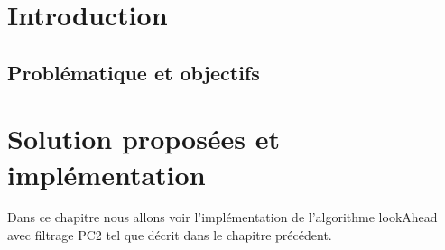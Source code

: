 \documentclass[12pt]{report}
\begin{document}
 
\tableofcontents
\listoffigures
\listoftables


\newpage

\chapter{Introduction}
	\section{Problématique et objectifs }
	\paragraph{}

\chapter{Solution proposées et implémentation}
Dans ce chapitre nous allons voir l'implémentation de l'algorithme lookAhead avec filtrage PC2 tel que décrit dans le chapitre précédent.
\end{document}
